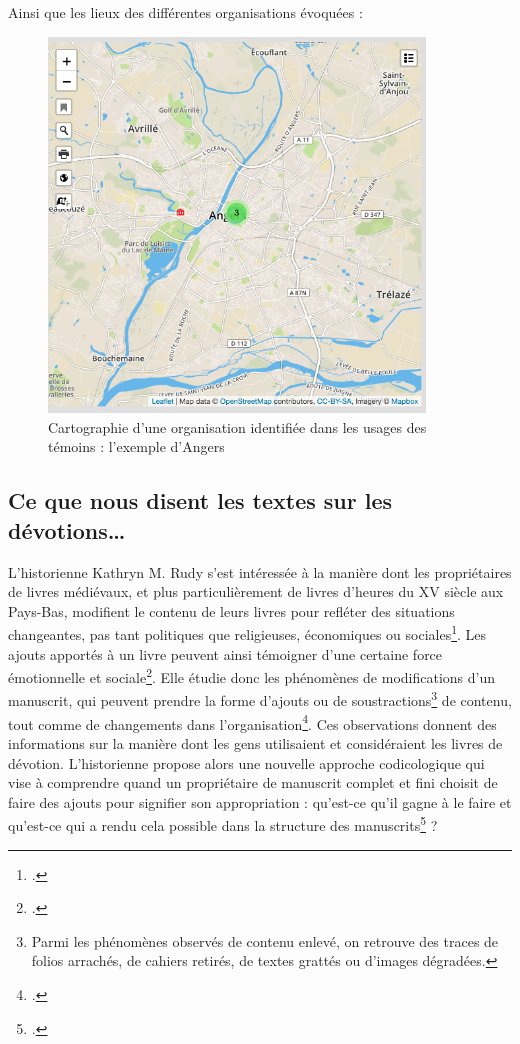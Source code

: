 \documentclass[a4paper,12pt,twoside]{book}
\begin{document}
Ainsi que les lieux des différentes organisations évoquées :
    \begin{figure}[!h]
    \centering
    \includegraphics[width=10cm]{img/DataViz/Lieu_Organisation.png}
    \caption{Cartographie d'une organisation identifiée dans les usages des témoins : l'exemple d'Angers}
    \end{figure}
    \clearpage

	
	\subsection{Ce que nous disent les textes sur les dévotions…}
	

L'historienne Kathryn M. Rudy s'est intéressée à la manière dont les propriétaires de livres médiévaux, et plus particulièrement de livres d'heures du \textsc{XV} siècle aux Pays-Bas, modifient le contenu de leurs livres pour refléter des situations changeantes, pas tant politiques que religieuses, économiques ou sociales\footcite[p. 1-2]{Piety_in_Pieces}. Les ajouts apportés à un livre peuvent ainsi témoigner d'une certaine force émotionnelle et sociale\footcite[p. 2]{Piety_in_Pieces}. Elle étudie donc les phénomènes de modifications d'un manuscrit, qui peuvent prendre la forme d'ajouts ou de soustractions\footnote{Parmi les phénomènes observés de contenu enlevé, on retrouve des traces de folios arrachés, de cahiers retirés, de textes grattés ou d'images dégradées.} de contenu, tout comme de changements dans l'organisation\footcite[p. 3]{Piety_in_Pieces}. Ces observations donnent des informations sur la manière dont les gens utilisaient et considéraient les livres de dévotion. L'historienne propose alors une nouvelle approche codicologique qui vise à comprendre quand un propriétaire de manuscrit complet et fini choisit de faire des ajouts pour signifier son appropriation : qu'est-ce qu'il gagne à le faire et qu'est-ce qui a rendu cela possible dans la structure des manuscrits\footcite[p. 5]{Piety_in_Pieces} ?
\end{document}
